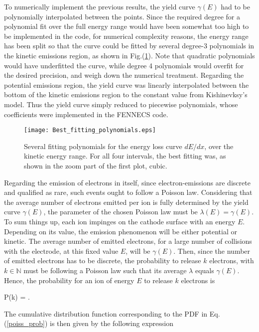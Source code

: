 \noindent To numerically implement the previous results, the yield curve $\gamma(E)$ had to be polynomially interpolated between the points. Since the required degree for a polynomial fit over the full energy range would have been somewhat too high to be implemented in the code, for numerical complexity reasons, the energy range has been split so that the curve could be fitted by several degree-3 polynomials in the kinetic emissions region, as shown in Fig.(\ref{Best_fit}). Note that quadratic polynomials would have underfitted the curve, while degree 4 polynomials would overfit for the desired precision, and weigh down the numerical treatment. Regarding the potential emissions region, the yield curve was linearly interpolated between the bottom of the kinetic emissions region to the constant value from Kishinevksy's model. Thus the yield curve simply reduced to piecewise polynomials, whose coefficients were implemented in the FENNECS code.\\

\begin{figure}[h!]
\centering
	\texttt{[image: Best\_fitting\_polynomials.eps]}
	\caption{\label{Best_fit} Several fitting polynomials for the energy loss curve $dE/dx$, over the kinetic energy range. For all four intervals, the best fitting was, as shown in the zoom part of the first plot, cubic.} 
\end{figure}  


Regarding the emission of electrons in itself, since electron-emissions are discrete and qualified as rare, such events ought to follow a Poisson law. Considering that the average number of electrons emitted per ion is fully determined by the yield curve $\gamma(E)$, the parameter of the chosen Poisson law must be $\lambda(E) = \gamma(E)$. To sum things up, each ion impinges on the cathode surface with an energy $E$. Depending on its value, the emission phenomenon will be either potential or kinetic. The average number of emitted electrons, for a large number of collisions with the electrode, at this fixed value $E$, will be $\gamma(E)$. Then, since the number of emitted electrons has to be discrete, the probability to release $k$ electrons, with $k\in \mathbb{N}$ must be following a Poisson law such that its average $\lambda$ equals $\gamma(E)$. Hence, the probability for an ion of energy $E$ to release $k$ electrons is

\beq
P(k) = .\label{poiss_prob}
\eeq

\noindent The cumulative distribution function corresponding to the PDF in Eq.(\ref{poiss_prob}) is then given by the following expression 


